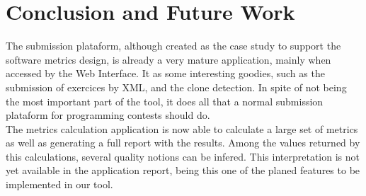\section{Conclusion and Future Work}\label{conc}
The submission plataform, although created as the case study to support the software metrics design, is already a very mature application, mainly when accessed by the Web Interface. It as some interesting goodies, such as the submission of exercices by XML, and the clone detection. In spite of not being the most important part of the tool, it does all that a normal submission plataform for programming contests should do.\\
The metrics calculation application is now able to calculate a large set of metrics as well as generating a full report with the results. Among the values returned by this calculations, several quality notions can be infered. This interpretation is not yet available in the application report, being this one of the planed features to be implemented in our tool.

